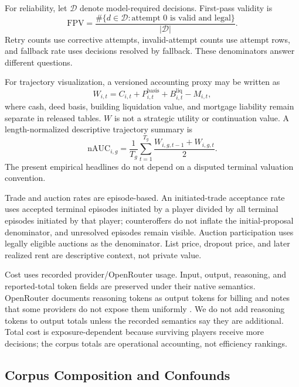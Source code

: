 \documentclass[conference]{IEEEtran}
\begin{document}
For reliability, let $\mathcal{D}$ denote model-required decisions. First-pass validity is
\begin{equation}
\mathrm{FPV}=\frac{\#\{d\in\mathcal{D}:\text{attempt }0\text{ is valid and legal}\}}{|\mathcal{D}|}.
\end{equation}
Retry counts use corrective attempts, invalid-attempt counts use attempt rows, and fallback rate uses decisions resolved by fallback. These denominators answer different questions.

For trajectory visualization, a versioned accounting proxy may be written as
\begin{equation}
W_{i,t}=C_{i,t}+P^{\mathrm{basis}}_{i,t}+B^{\mathrm{liq}}_{i,t}-M_{i,t},
\end{equation}
where cash, deed basis, building liquidation value, and mortgage liability remain separate in released tables. $W$ is not a strategic utility or continuation value. A length-normalized descriptive trajectory summary is
\begin{equation}
\mathrm{nAUC}_{i,g}=\frac{1}{T_g}\sum_{t=1}^{T_g}\frac{W_{i,g,t-1}+W_{i,g,t}}{2}.
\end{equation}
The present empirical headlines do not depend on a disputed terminal valuation convention.

Trade and auction rates are episode-based. An initiated-trade acceptance rate uses accepted terminal episodes initiated by a player divided by all terminal episodes initiated by that player; counteroffers do not inflate the initial-proposal denominator, and unresolved episodes remain visible. Auction participation uses legally eligible auctions as the denominator. List price, dropout price, and later realized rent are descriptive context, not private value.

Cost uses recorded provider/OpenRouter usage. Input, output, reasoning, and reported-total token fields are preserved under their native semantics. OpenRouter documents reasoning tokens as output tokens for billing and notes that some providers do not expose them uniformly \cite{openrouter_reasoning}. We do not add reasoning tokens to output totals unless the recorded semantics say they are additional. Total cost is exposure-dependent because surviving players receive more decisions; the corpus totals are operational accounting, not efficiency rankings.

\subsection{Corpus Composition and Confounds}
\end{document}
